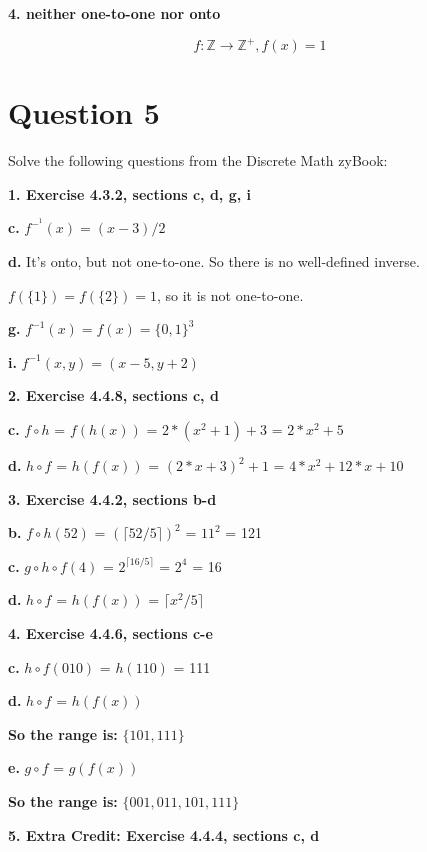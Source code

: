 \documentclass[11pt]{article}
\begin{document}
	\textbf{4. neither one-to-one nor onto}
	
	\begin{equation*}
	    f\colon\mathbb{Z}\rightarrow\mathbb{Z^+}, f(x) = 1
	\end{equation*}
	
	\newpage
	\section*{Question 5}
	
	Solve the following questions from the Discrete Math zyBook:
	
	\textbf{1. Exercise 4.3.2, sections c, d, g, i}
	
	\textbf{c.}
	$f^-^1(x)=(x-3)/2$
	
	\textbf{d.}
	It's onto, but not one-to-one. So there is no well-defined inverse.
	
	$f(\{1\})=f(\{2\})=1$, so it is not one-to-one.
	
	\textbf{g.}
	$f^{-1}(x)=f(x)=\{0,1\}^3$
	
	\textbf{i.}
	$f^{-1}(x,y)=(x-5,y+2)$
	
	\vspace{10mm}
	\textbf{2. Exercise 4.4.8, sections c, d}
	
	\textbf{c.}
	$f\circ h$ = $f(h(x))$ = $2*(x^2+1)+3$ = $2*x^2+5$
	
	\textbf{d.}
	$h\circ f$ = $h(f(x))$ = $(2*x+3)^2+1$ = $4*x^2+12*x+10$
	
	\vspace{10mm}
	\textbf{3. Exercise 4.4.2, sections b-d}
	
	\textbf{b.}
	$f\circ h(52)$ = $(\lceil 52/5\rceil)^2$ = $11^2$ = 121
	
	\textbf{c.}
	$g\circ h\circ f(4)$ = $2^{\lceil 16/5\rceil}$ = $2^4$ = 16
	
	\textbf{d.}
	$h\circ f$ = $h(f(x))$ = $\lceil x^2/5\rceil$
	
	\vspace{10mm}
	\textbf{4. Exercise 4.4.6, sections c-e}
	
	\textbf{c.}
	$h\circ f(010)$ = $h(110)$ = 111
	
	\textbf{d.}
	$h\circ f$ = $h(f(x))$
	
	\textbf{So the range is:} $\{101,111\}$
	
	\textbf{e.}
	$g\circ f$ = $g(f(x))$
	
	\textbf{So the range is:} $\{001,011,101,111\}$
	
	\vspace{10mm}
	\textbf{5. Extra Credit: Exercise 4.4.4, sections c, d}
	
\end{document}
